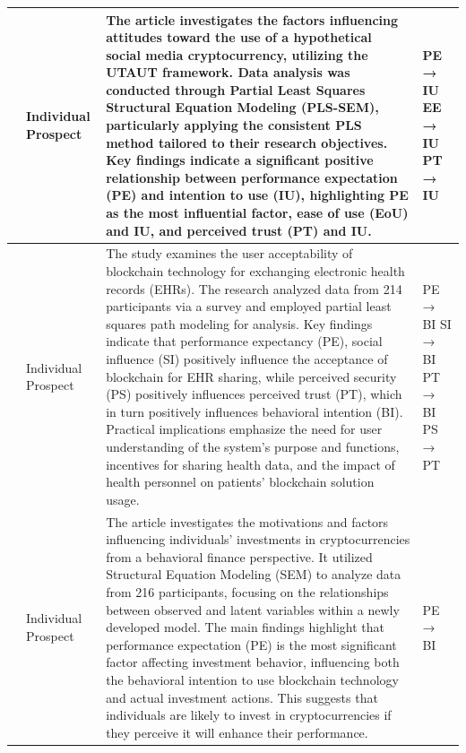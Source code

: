 \documentclass[twocolumn]{article}
\begin{document}
\begin{landscape}
\begin{longtable}{|p{1.7cm}|p{1.5cm}|p{17.7cm}|p{2.0cm}|}
\hline
\endlastfoot
\small
\textcite{aranyossy_konzisztens_2021} & Individual Prospect & The article investigates the factors influencing attitudes toward the use of a hypothetical social media cryptocurrency, utilizing the UTAUT framework. Data analysis was conducted through Partial Least Squares Structural Equation Modeling (PLS-SEM), particularly applying the consistent PLS method tailored to their research objectives. Key findings indicate a significant positive relationship between performance expectation (PE) and intention to use (IU), highlighting PE as the most influential factor, ease of use (EoU) and IU, and perceived trust (PT) and IU. & PE → IU \newline EE → IU \newline PT → IU  \\
\hline
\textcite{baltruschat_user_2023} & Individual Prospect & The study examines the user acceptability of blockchain technology for exchanging electronic health records (EHRs). The research analyzed data from 214 participants via a survey and employed partial least squares path modeling for analysis. Key findings indicate that performance expectancy (PE), social influence (SI) positively influence the acceptance of blockchain for EHR sharing, while perceived security (PS) positively influences perceived trust (PT), which in turn positively influences behavioral intention (BI). Practical implications emphasize the need for user understanding of the system's purpose and functions, incentives for sharing health data, and the impact of health personnel on patients' blockchain solution usage. & PE → BI \newline SI → BI \newline PT → BI \newline PS → PT  \\
\hline
\textcite{bozkurt_is_2022} & Individual Prospect & The article investigates the motivations and factors influencing individuals' investments in cryptocurrencies from a behavioral finance perspective. It utilized Structural Equation Modeling (SEM) to analyze data from 216 participants, focusing on the relationships between observed and latent variables within a newly developed model. The main findings highlight that performance expectation (PE) is the most significant factor affecting investment behavior, influencing both the behavioral intention to use blockchain technology and actual investment actions. This suggests that individuals are likely to invest in cryptocurrencies if they perceive it will enhance their performance.  & PE → BI \\

\end{longtable}
\end{landscape}
\end{document}
